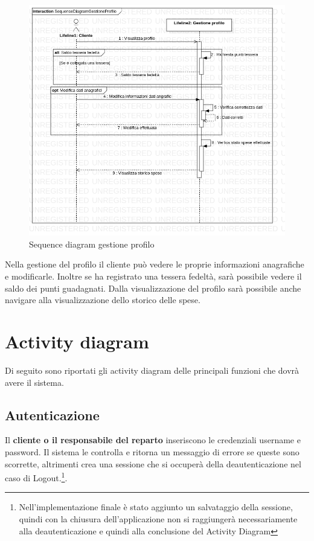 \documentclass[12pt, a4paper]{report}
\begin{document}
\begin{figure}[h]
  \centering
  \includegraphics[width=\textwidth]{Use Case Model!Gestione profilo!InteractionGestioneProfilo!SequenceDiagramGestioneProfilo_5.png}
  \caption{Sequence diagram gestione profilo}
\end{figure}

Nella gestione del profilo il cliente può vedere le proprie informazioni
anagrafiche e modificarle. Inoltre se ha registrato una tessera fedeltà, sarà
possibile vedere il saldo dei punti guadagnati. Dalla visualizzazione del
profilo sarà possibile anche navigare alla visualizzazione dello storico delle
spese.

\newpage

\section{Activity diagram}

Di seguito sono riportati gli activity diagram delle principali funzioni che
dovrà avere il sistema.

\subsection{Autenticazione}

Il \textbf{cliente o il responsabile del reparto} inseriscono le credenziali
username e password. Il sistema le controlla e ritorna un messaggio di errore
se queste sono scorrette, altrimenti crea una sessione che si occuperà della
deautenticazione nel caso di Logout.\footnote{Nell'implementazione finale è
stato aggiunto un salvataggio della sessione, quindi con la chiusura
dell'applicazione non si raggiungerà necessariamente alla deautenticazione e
quindi alla conclusione del Activity Diagram}.
\end{document}
